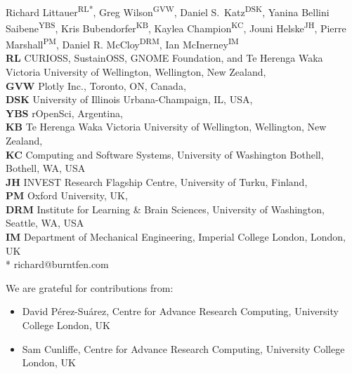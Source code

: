 \documentclass[10pt,letterpaper]{article}
\begin{document}
\vspace*{0.2in}

\begin{flushleft}
{\Large
\textbf{}
}
\newline
\\
Richard Littauer\textsuperscript{RL*},
Greg Wilson\textsuperscript{GVW},
Daniel S.\ Katz\textsuperscript{DSK},
Yanina Bellini Saibene\textsuperscript{YBS},
Kris Bubendorfer\textsuperscript{KB},
Kaylea Champion\textsuperscript{KC},
Jouni Helske\textsuperscript{JH},
Pierre Marshall\textsuperscript{PM},
Daniel R. McCloy\textsuperscript{DRM}, 
Ian McInerney\textsuperscript{IM}
\\
\bigskip
\textbf{RL} CURIOSS, SustainOSS, GNOME Foundation, and Te Herenga Waka Victoria University of Wellington, Wellington, New Zealand, \\
\textbf{GVW} Plotly Inc., Toronto, ON, Canada, \\
\textbf{DSK} University of Illinois Urbana-Champaign, IL, USA, \\
\textbf{YBS} rOpenSci, Argentina, \\
\textbf{KB} Te Herenga Waka Victoria University of Wellington, Wellington, New Zealand, \\
\textbf{KC} Computing and Software Systems, University of Washington Bothell, Bothell, WA, USA \\
\textbf{JH} INVEST Research Flagship Centre, University of Turku, Finland, \\
\textbf{PM} Oxford University, UK, \\
\textbf{DRM} Institute for Learning \& Brain Sciences, University of Washington, Seattle, WA, USA \\
\textbf{IM} Department of Mechanical Engineering, Imperial College London, London, UK \\
* richard@burntfen.com
\end{flushleft}

We are grateful for contributions from:

\begin{itemize}
\item
  David Pérez-Suárez, Centre for Advance Research Computing, University College London, UK \\
\item
  Sam Cunliffe, Centre for Advance Research Computing, University College London, UK \\
\end{itemize}
\end{document}
